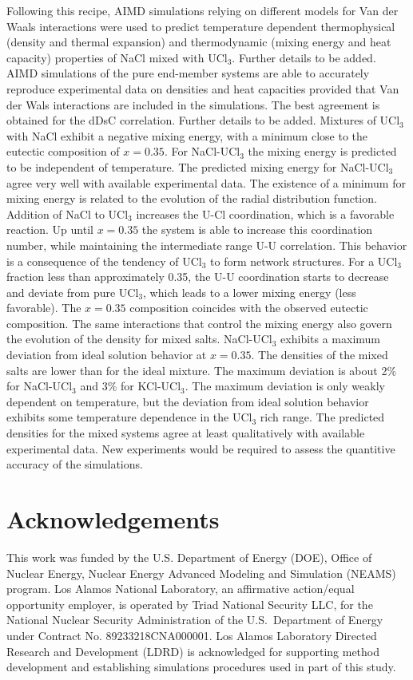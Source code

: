 \documentclass[preprint,3p,10pt,onecolumn,number,sort&compress]{elsarticle}
\begin{document}
Following this recipe, AIMD simulations relying on different models for Van der Waals interactions were used to predict temperature dependent thermophysical (density and thermal expansion) and thermodynamic (mixing energy and heat capacity) properties of NaCl mixed with UCl$_3$. {\color{red} Further details to be added.}
AIMD simulations of the pure end-member systems are able to accurately reproduce experimental data on densities and heat capacities provided that Van der Wals interactions are included in the simulations. The best agreement is obtained for the dDsC correlation. {\color{red} Further details to be added.} Mixtures of UCl$_3$ with NaCl exhibit a negative mixing energy, with a minimum close to the eutectic composition of $x=0.35$. For NaCl-UCl$_3$ the mixing energy is predicted to be independent of temperature. The predicted mixing energy for NaCl-UCl$_3$ agree very well with available experimental data. 
The existence of a minimum for mixing energy is related to the evolution of the radial distribution function. Addition of NaCl to UCl$_3$ increases the U-Cl coordination, which is a favorable reaction. Up until $x=0.35$ the system is able to increase this coordination number, while maintaining the intermediate range U-U correlation. This behavior is a consequence of the tendency of UCl$_3$ to form network structures. For a UCl$_3$ fraction less than approximately 0.35, the U-U coordination starts to decrease and deviate from pure UCl$_3$, which leads to a lower mixing energy (less favorable). The $x=0.35$ composition coincides with the observed eutectic composition. 
The same interactions that control the mixing energy also govern the evolution of the density for mixed salts. NaCl-UCl$_3$ exhibits a maximum deviation from ideal solution behavior at $x=0.35$. The densities of the mixed salts are lower than for the ideal mixture. The maximum deviation is about 2\% for NaCl-UCl$_3$ and 3\% for KCl-UCl$_3$. The maximum deviation is only weakly dependent on temperature, but the deviation from ideal solution behavior exhibits some temperature dependence in the UCl$_3$ rich range. The predicted densities for the mixed systems agree at least qualitatively with available experimental data. New experiments would be required to assess the quantitive accuracy of the simulations. 

\section*{Acknowledgements}
This work was funded by the U.S. Department of Energy (DOE), Office of Nuclear Energy, Nuclear Energy Advanced Modeling and Simulation (NEAMS) program. Los Alamos National Laboratory, an affirmative action/equal opportunity employer, is operated by Triad National Security LLC, for the National Nuclear Security Administration of the U.S.\ Department of Energy under Contract No. 89233218CNA000001. Los Alamos Laboratory Directed Research and Development (LDRD) is acknowledged for supporting method development and establishing simulations procedures used in part of this study.

         

\end{document}
